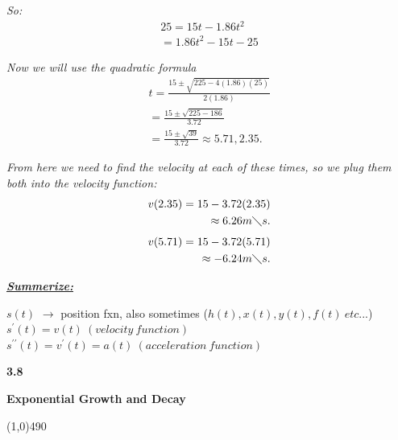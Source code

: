 \documentclass{report}
\begin{document}
    \bigbreak \noindent
    \textit{So:}
    \begin{align*}
      25 = 15t-1.86t^{2} \\ 
      = 1.86t^{2} -15t -25
    \end{align*}

    \bigbreak \noindent 
    \textit{Now we will use the quadratic formula}
    \begin{align*}
      t = \frac{15\pm \sqrt{225 - 4(1.86)(25)}}{2(1.86)} \\
      = \frac{15\pm \sqrt{225-186}}{3.72} \\
      =  \frac{15\pm \sqrt{39}}{3.72} 
      \approx 5.71, 2.35
    .\end{align*}
      
    \bigbreak \noindent 

    \bigbreak \noindent 
    \textit{From here we need to find the velocity at each of these times, so we plug them both into the velocity function:}
    \begin{align*}
      v(2.35) = 15-3.72(2.35) \\
      \approx 6.26 m \diagdown s 
    .\end{align*}
    \begin{align*}
      v(5.71) = 15-3.72(5.71) \\
      \approx - 6.24 m \diagdown s 
    .\end{align*}

    \bigbreak \noindent 
    \textbf{\textit{\underline{Summerize:}}}
    \begin{center}
      $s(t)$  $\longrightarrow$ position fxn, also sometimes ($h(t), x(t), y(t), f(t)\ etc...$) 
      \smallbreak \noindent
      $s^{\prime}(t) = v(t)\ (velocity\ function)$ 
      \smallbreak \noindent
      $s^{\prime\prime}(t) = v^{\prime}(t) = a(t)\ (acceleration\ function)$
    \end{center}

    \pagebreak \bigbreak \noindent
    \begin{Large}
        \begin{mdframed}
            \begin{center}
                \textbf{3.8}
            \end{center}
        \end{mdframed}
    \end{Large}
    \begin{Large}
        \begin{center}
            \textbf{Exponential Growth and Decay}
        \end{center}
    \end{Large}
    \line(1,0){490}
    
\end{document}
